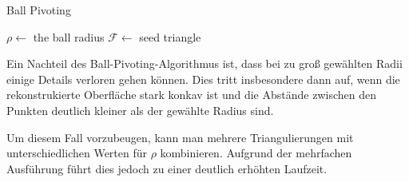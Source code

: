 \begin{algorithm}[H]
\caption[Ball Pivoting]{Ball Pivoting \cite[Abs. 4]{bernardini1999ball}}
\label{alg:ball-pivoting}
\begin{algorithmic}
\State $\rho \gets$ the ball radius
\State $\mathcal{F} \gets$ seed triangle
			\State {}
			\State {}
				\State {}
			\EndIf
				\State {}
			\EndIf
		\Else
			\State {}
		\EndIf
	\EndWhile
		\State {}
		\State {}
		\State {}
		\State {}
	\Else
		\State \Return
	\EndIf
\EndWhile
\end{algorithmic}
\end{algorithm}

Ein Nachteil des Ball-Pivoting-Algorithmus ist, dass bei zu groß gewählten Radii einige Details verloren gehen können.
Dies tritt insbesondere dann auf, wenn die rekonstrukierte Oberfläche stark konkav ist und die Abstände zwischen den Punkten deutlich kleiner als der gewählte Radius sind.

Um diesem Fall vorzubeugen, kann man mehrere Triangulierungen mit unterschiedlichen Werten für $\rho$ kombinieren.
Aufgrund der mehrfachen Ausführung führt dies jedoch zu einer deutlich erhöhten Laufzeit.